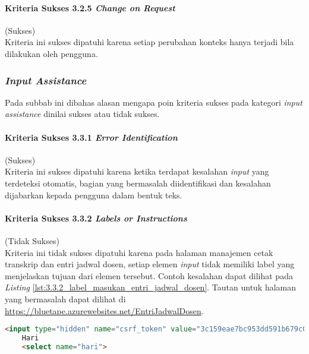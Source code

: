 \paragraph{Kriteria Sukses 3.2.5 \textit{Change on Request}}
\label{par:kepatuhan_bluetape_kriteria_sukses_3.2.5}
(Sukses)\\

Kriteria ini sukses dipatuhi karena setiap perubahan konteks hanya terjadi bila dilakukan oleh pengguna.

\subsubsection{\textit{Input Assistance}}
\label{subsubsec:kepatuhan_bluetape_input_assistance}
Pada subbab ini dibahas alasan mengapa poin kriteria sukses pada kategori \textit{input assistance} dinilai sukses atau tidak sukses.

\paragraph{Kriteria Sukses 3.3.1 \textit{Error Identification}}
\label{par:kepatuhan_bluetape_kriteria_sukses_3.3.1}
(Sukses)\\

Kriteria ini sukses dipatuhi karena ketika terdapat kesalahan \textit{input} yang terdeteksi otomatis, bagian yang bermasalah diidentifikasi dan kesalahan dijabarkan kepada pengguna dalam bentuk teks.

\paragraph{Kriteria Sukses 3.3.2 \textit{Labels or Instructions}}
\label{par:kepatuhan_bluetape_kriteria_sukses_3.3.2}
(Tidak Sukses)\\

Kriteria ini tidak sukses dipatuhi karena pada halaman manajemen cetak transkrip dan entri jadwal dosen, setiap elemen \textit{input} tidak memiliki label yang menjelaskan tujuan dari elemen tersebut. Contoh kesalahan dapat dilihat pada \textit{Listing} \ref{lst:3.3.2_label_masukan_entri_jadwal_dosen}. Tautan untuk halaman yang bermasalah dapat dilihat di \url{https://bluetape.azurewebsites.net/EntriJadwalDosen}.

\begin{lstlisting}[frame=single, label={lst:3.3.2_label_masukan_entri_jadwal_dosen}, language=HTML, caption=Pelanggaran Kriteria Sukses 3.3.2 pada Halaman Entri Jadwal Dosen]
    <input type="hidden" name="csrf_token" value="3c159eae7bc953dd591b679c080ed066"/>
    Hari
    <select name="hari">
\end{lstlisting}

